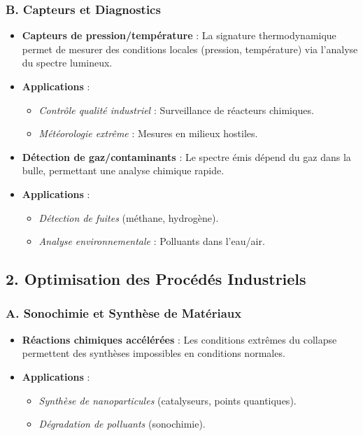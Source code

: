 \documentclass[a4paper,12pt]{article}
\begin{document}
\subsubsection*{B. Capteurs et Diagnostics}
\begin{itemize}
    \item \textbf{Capteurs de pression/température} : La signature thermodynamique permet de mesurer des conditions locales (pression, température) via l’analyse du spectre lumineux.
    \item \textbf{Applications} :
    \begin{itemize}
        \item \textit{Contrôle qualité industriel} : Surveillance de réacteurs chimiques.
        \item \textit{Météorologie extrême} : Mesures en milieux hostiles.
    \end{itemize}
    \item \textbf{Détection de gaz/contaminants} : Le spectre émis dépend du gaz dans la bulle, permettant une analyse chimique rapide.
    \item \textbf{Applications} :
    \begin{itemize}
        \item \textit{Détection de fuites} (méthane, hydrogène).
        \item \textit{Analyse environnementale} : Polluants dans l’eau/air.
    \end{itemize}
\end{itemize}

\subsection*{2. Optimisation des Procédés Industriels}
\subsubsection*{A. Sonochimie et Synthèse de Matériaux}
\begin{itemize}
    \item \textbf{Réactions chimiques accélérées} : Les conditions extrêmes du collapse permettent des synthèses impossibles en conditions normales.
    \item \textbf{Applications} :
    \begin{itemize}
        \item \textit{Synthèse de nanoparticules} (catalyseurs, points quantiques).
        \item \textit{Dégradation de polluants} (sonochimie).
    \end{itemize}
\end{itemize}
\end{document}
